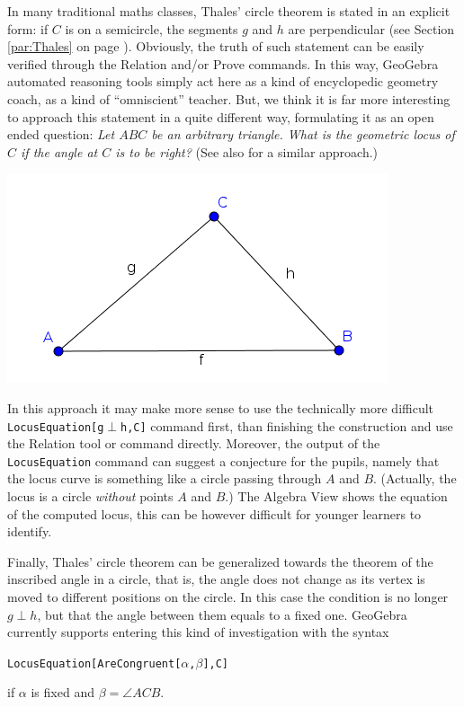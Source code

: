 \documentclass{article}
\begin{document}
In many traditional maths classes, Thales' circle theorem is stated in an explicit form: if $C$ is on a semicircle, the segments $g$ and $h$ are perpendicular (see Section \ref{par:Thales} on page
\pageref{par:Thales}). Obviously,  the truth of such statement can be easily verified through the Relation and/or Prove commands. In this way, GeoGebra automated reasoning tools simply act here as a kind of encyclopedic geometry coach, as a kind of ``omniscient'' teacher.  But, we think it is far more interesting to approach this statement in a quite different way, formulating it as an open ended question: \textit{Let $ABC$ be an arbitrary triangle. What is the geometric locus of $C$ if the angle at $C$ is to be right?} (See also
\cite{Artigue} for a similar approach.)
\begin{center}
\includegraphics[scale=0.5]{Thales-triangle}
\end{center}
In this approach it may make more sense to use the technically more difficult \texttt{LocusEquation[g$\perp$h,C]} command first, than finishing the construction and use the Relation tool or command directly. Moreover, the output of the \texttt{LocusEquation} command can suggest a conjecture for the pupils, namely that the locus curve is something like a circle passing through $A$ and $B$. (Actually, the locus
is a circle \textit{without} points $A$ and $B$.) The Algebra View shows the equation of the
computed locus, this can be however difficult for younger learners to identify.

Finally, Thales' circle theorem can be generalized towards the theorem of the inscribed angle in a circle,
that is, the angle does not change as its vertex is moved to different positions on the circle.
In this case the condition is no longer $g\perp h$, but that the angle between them equals to a fixed one. GeoGebra currently supports entering this kind of investigation with the syntax
\begin{center}
\texttt{LocusEquation[AreCongruent[$\alpha$,$\beta$],C]}
\end{center}
if $\alpha$ is fixed and $\beta=\angle{ACB}$.
\end{document}
